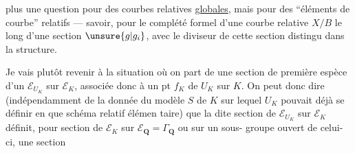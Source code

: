 plus une question pour des courbes relatives
\uline{globales}, mais pour des ``éléments de
courbe'' relatifs --- savoir, pour le
complété formel d'une courbe relative
$X/B$ le long d'une section $\unsure{g|g_i}$,
avec le diviseur de cette section distingu %
dans la structure.

Je vais plutôt revenir à la situation
où on part de une section de première
espèce d'un $\mathcal E_{U_K}$ sur $\mathcal E_K$, associée
donc à un pt  $f_K$ de $U_K$ sur $K$.
On peut donc dire (indépendamment de
la donnée du modèle $S$ de $K$ sur
lequel $U_K$ pouvait déjà se définir
en  que schéma relatif élémen%
taire) que la dite section de
$\mathcal E_{U_K}$ sur $\mathcal E_K$  définit, pour  section
de $\mathcal E_K$ sur $\mathcal E_{\mathbf Q}=\Gamma_{\mathbf Q}$ ou sur un sous-%
groupe ouvert  de celui-ci, une section
